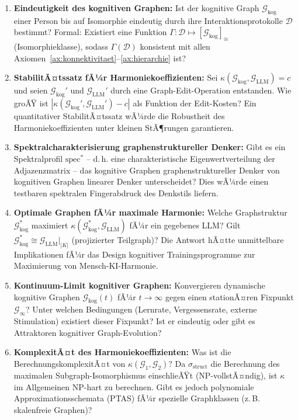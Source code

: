 ﻿\documentclass[12pt,a4paper]{article}
\theoremstyle{plain}
\theoremstyle{definition}
\theoremstyle{remark}
\newcommand{\GG}{\mathcal{G}}
\begin{document}
\begin{enumerate}[label=\textbf{(P\arabic*)}]
  \item \textbf{Eindeutigkeit des kognitiven Graphen:} Ist der kognitive Graph $\GG_{\text{kog}}$ einer Person bis auf Isomorphie eindeutig durch ihre Interaktionsprotokolle $\mathcal{D}$ bestimmt? Formal: Existiert eine Funktion $\Gamma: \mathcal{D} \mapsto [\GG_{\text{kog}}]_{\cong}$ (Isomorphieklasse), sodass $\Gamma(\mathcal{D})$ konsistent mit allen Axiomen~\ref{ax:konnektivitaet}--\ref{ax:hierarchie} ist?

  \item \textbf{StabilitÃ¤tssatz fÃ¼r Harmoniekoeffizienten:} Sei $\kappa(\GG_{\text{kog}}, \GG_{\text{LLM}}) = c$ und seien $\GG_{\text{kog}}'$ und $\GG_{\text{LLM}}'$ durch eine Graph-Edit-Operation entstanden. Wie groÃŸ ist $|\kappa(\GG_{\text{kog}}', \GG_{\text{LLM}}') - c|$ als Funktion der Edit-Kosten? Ein quantitativer StabilitÃ¤tssatz wÃ¼rde die Robustheit des Harmoniekoeffizienten unter kleinen StÃ¶rungen garantieren.

  \item \textbf{Spektralcharakterisierung graphenstruktureller Denker:} Gibt es ein Spektralprofil $\text{spec}^*$ -- d.\,h. eine charakteristische Eigenwertverteilung der Adjazenzmatrix -- das kognitive Graphen graphenstruktureller Denker von kognitiven Graphen linearer Denker unterscheidet? Dies wÃ¼rde einen testbaren spektralen Fingerabdruck des Denkstils liefern.

  \item \textbf{Optimale Graphen fÃ¼r maximale Harmonie:} Welche Graphstruktur $\GG_{\text{kog}}^*$ maximiert $\kappa(\GG_{\text{kog}}^*, \GG_{\text{LLM}})$ fÃ¼r ein gegebenes LLM? Gilt $\GG_{\text{kog}}^* \cong \GG_{\text{LLM}}|_{|K|}$ (projizierter Teilgraph)? Die Antwort hÃ¤tte unmittelbare Implikationen fÃ¼r das Design kognitiver Trainingsprogramme zur Maximierung von Mensch-KI-Harmonie.

  \item \textbf{Kontinuum-Limit kognitiver Graphen:} Konvergieren dynamische kognitive Graphen $\GG_{\text{kog}}(t)$ fÃ¼r $t \to \infty$ gegen einen stationÃ¤ren Fixpunkt $\GG_\infty$? Unter welchen Bedingungen (Lernrate, Vergessensrate, externe Stimulation) existiert dieser Fixpunkt? Ist er eindeutig oder gibt es Attraktoren kognitiver Graph-Evolution?

  \item \textbf{KomplexitÃ¤t des Harmoniekoeffizienten:} Was ist die BerechnungskomplexitÃ¤t von $\kappa(\GG_1, \GG_2)$? Da $\sigma_{\text{struct}}$ die Berechnung des maximalen Subgraph-Isomorphismus einschlieÃŸt (NP-vollstÃ¤ndig), ist $\kappa$ im Allgemeinen NP-hart zu berechnen. Gibt es jedoch polynomiale Approximationsschemata (PTAS) fÃ¼r spezielle Graphklassen (z.\,B. skalenfreie Graphen)?
\end{enumerate}
\end{document}
